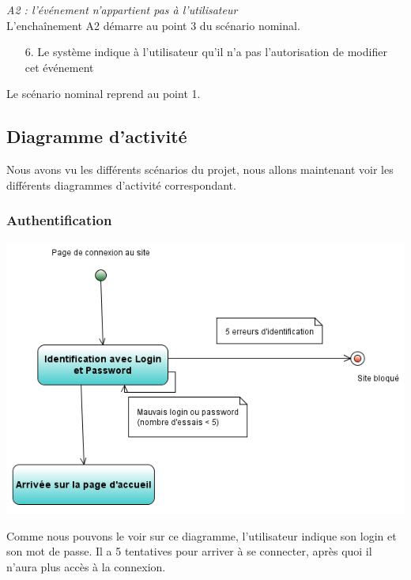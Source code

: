 \documentclass[12pt , a4paper]{article}
\begin{document}
\noindent\textit{A2 : l’événement n’appartient pas à l’utilisateur}\\
L'encha\^inement A2 démarre au point 3 du scénario nominal.
\begin{enumerate}
\item[6.] Le système indique à l’utilisateur qu’il n’a pas l’autorisation de modifier cet événement
\end{enumerate}
Le scénario nominal reprend au point 1.\\

\subsection{Diagramme d'activité}
\noindent Nous avons vu les différents scénarios du projet, nous allons maintenant voir les différents diagrammes d'activité correspondant.

\subsubsection{Authentification}
\begin{center}
  \includegraphics[scale=0.6]{./images/diag_act_authentification.png}
\end{center}
\noindent Comme nous pouvons le voir sur ce diagramme, l'utilisateur indique son login et son mot de passe. Il a 5 tentatives pour arriver à se connecter, après quoi il n'aura plus accès à la connexion.
\end{document}
